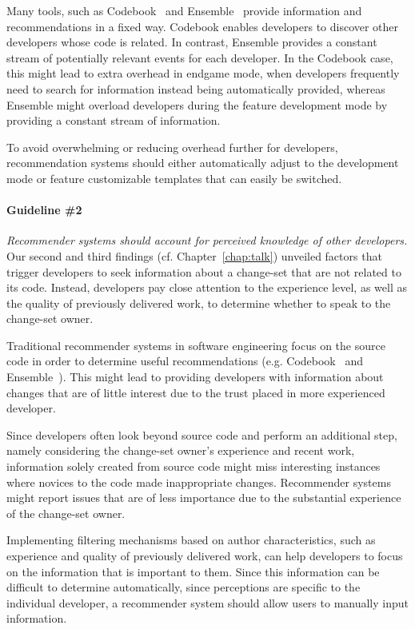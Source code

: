 Many tools, such as Codebook~\cite{begel:icse:2010} and Ensemble~\cite{xiang:rsse:2008} provide information and recommendations in a fixed way. 
Codebook enables developers to discover other developers whose code is related.
In contrast,  Ensemble provides a constant stream of potentially relevant events for each developer.
In the Codebook case, this might lead to extra overhead in endgame mode, when developers frequently need to search for information instead being automatically provided, whereas Ensemble might overload developers during the feature development mode by providing a constant stream of information.

To avoid overwhelming or reducing overhead further for developers, recommendation systems should either automatically adjust to the development mode or feature customizable templates that can easily be switched. 

\paragraph{Guideline \#2} \emph{Recommender systems should account for perceived knowledge of other developers.}
Our second and third findings (cf. Chapter~\ref{chap:talk}) unveiled factors that trigger developers to seek information about a change-set that are not related to its code. 
Instead, developers pay close attention to the experience level, as well as the quality of previously delivered work, to determine whether to speak to the change-set owner.

Traditional recommender systems in software engineering focus on the source code in order to determine useful recommendations (e.g. Codebook~\cite{begel:icse:2010} and Ensemble~\cite{xiang:rsse:2008}).
This might lead to providing developers with information about changes that are of little interest due to the trust placed in more experienced developer. 

Since developers often look beyond source code and perform an additional step, namely considering the change-set owner's experience and recent work, information solely created from source code might miss interesting instances where novices to the code made inappropriate changes.
Recommender systems might report issues that are of less importance due to the substantial experience of the change-set owner.

Implementing filtering mechanisms based on author characteristics, such as experience and quality of previously delivered work, can help developers to focus on the information that is important to them.
Since this information can be difficult to determine automatically, since perceptions are specific to the individual developer, a recommender system should allow users to manually input information.


